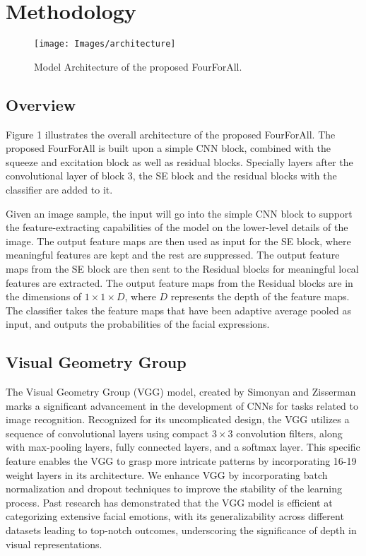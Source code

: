 \section{Methodology}
\begin{figure*}
	\texttt{[image: Images/architecture]}
	\caption{Model Architecture of the proposed FourForAll.}
\end{figure*}

\subsection{Overview}
Figure 1 illustrates the overall architecture of the proposed FourForAll. The proposed FourForAll is built upon a simple CNN block, combined with the squeeze and excitation block as well as residual blocks. Specially layers after the convolutional layer of block 3, the SE block and the residual blocks with the classifier are added to it.

Given an image sample, the input will go into the simple CNN block to support the feature-extracting capabilities of the model on the lower-level details of the image. The output feature maps are then used as input for the SE block, where meaningful features are kept and the rest are suppressed. The output feature maps from the SE block are then sent to the Residual blocks for meaningful local features are extracted. The output feature maps from the Residual blocks are in the dimensions of ${1 \times 1 \times  D}$, where $D$ represents the depth of the feature maps. The classifier takes the feature maps that have been adaptive average pooled as input, and outputs the probabilities of the facial expressions.

\subsection{Visual Geometry Group}
The Visual Geometry Group (VGG) model, created by Simonyan and Zisserman \cite{simonyan2014very} marks a significant advancement in the development of CNNs for tasks related to image recognition. Recognized for its uncomplicated design, the VGG utilizes a sequence of convolutional layers using compact ${3 \times 3}$ convolution filters, along with max-pooling layers, fully connected layers, and a softmax layer. This specific feature enables the VGG to grasp more intricate patterns by incorporating 16-19 weight layers in its architecture. We enhance VGG by incorporating batch normalization and dropout techniques to improve the stability of the learning process. Past research has demonstrated that the VGG model is efficient at categorizing extensive facial emotions, with its generalizability across different datasets leading to top-notch outcomes, underscoring the significance of depth in visual representations.

